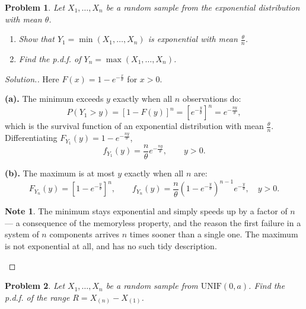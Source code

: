 \documentclass[12pt,a4paper]{report}
\theoremstyle{definition}
\newtheorem{note}[thm]{Note}
\theoremstyle{plain}
\newtheorem{problemx}{Problem}[section]
\newenvironment{problem}{\begin{problemx}}{\end{problemx}}
\newenvironment{solution}
  {\renewcommand{\qedsymbol}{}\begin{proof}[\textit{Solution}.]}
  {\end{proof}}
\begin{document}
\begin{problem}
Let $X_1,\ldots,X_n$ be a random sample from the exponential distribution with
mean $\theta$.
\begin{enumerate}
\item[(a).] Show that $Y_1=\min\left(X_1,\ldots,X_n\right)$ is exponential with
mean $\frac{\theta}{n}$.
\item[(b).] Find the p.d.f. of $Y_n=\max\left(X_1,\ldots,X_n\right)$.
\end{enumerate}
\end{problem}

\begin{solution}
Here $F(x)=1-e^{-\frac{x}{\theta}}$ for $x>0$.

\textbf{(a).} The minimum exceeds $y$ exactly when all $n$ observations do:
\[P\left(Y_1>y\right)=\left[1-F(y)\right]^n
=\left[e^{-\frac{y}{\theta}}\right]^n=e^{-\frac{ny}{\theta}},\]
which is the survival function of an exponential distribution with mean
$\frac{\theta}{n}$. Differentiating $F_{Y_1}(y)=1-e^{-\frac{ny}{\theta}}$,
\[f_{Y_1}(y)=\frac{n}{\theta}e^{-\frac{ny}{\theta}},\qquad y>0.\]

\textbf{(b).} The maximum is at most $y$ exactly when all $n$ are:
\[F_{Y_n}(y)=\left[1-e^{-\frac{y}{\theta}}\right]^n,\qquad
f_{Y_n}(y)=\frac{n}{\theta}\left(1-e^{-\frac{y}{\theta}}\right)^{n-1}
e^{-\frac{y}{\theta}},\quad y>0.\]

\begin{note}
The minimum stays exponential and simply speeds up by a factor of $n$ --- a
consequence of the memoryless property, and the reason the first failure in a
system of $n$ components arrives $n$ times sooner than a single one. The maximum
is not exponential at all, and has no such tidy description.
\end{note}
\end{solution}

\begin{problem}
Let $X_1,\ldots,X_n$ be a random sample from $\text{UNIF}(0,a)$. Find the p.d.f.
of the range $R=X_{(n)}-X_{(1)}$.
\end{problem}
\end{document}
